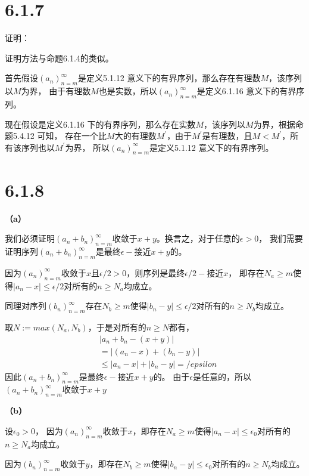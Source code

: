 \documentclass{article}
\theoremstyle{mystyle}
\begin{document}
\section*{6.1.7}

证明：

证明方法与命题6.1.4的类似。

首先假设$(a_n)_{n=m}^\infty$是定义5.1.12 意义下的有界序列，那么存在有理数$M$，该序列以$M$为界，
由于有理数$M$也是实数，所以$(a_n)_{n=m}^\infty$是定义6.1.16 意义下的有界序列。

现在假设是定义6.1.16 下的有界序列，那么存在实数$M$，该序列以$M$为界，根据命题5.4.12 可知，
存在一个比$M$大的有理数$M^\prime$，由于$M^\prime$是有理数，且$M < M^\prime$，所有该序列也以$M^\prime$为界，
所以$(a_n)_{n=m}^\infty$是定义5.1.12 意义下的有界序列。

\section*{6.1.8}

\textbf{（a）}

我们必须证明$(a_n+b_n)_{n=m}^\infty$收敛于$x+y$。换言之，对于任意的$\epsilon > 0$，
我们需要证明序列$(a_n+b_n)_{n=m}^\infty$是最终$\epsilon -$接近$x+y$的。

因为$(a_n)_{n=m}^\infty$收敛于$x$且$\epsilon /2 > 0$，则序列是最终$\epsilon /2 -$接近$x$，
即存在$N_a \geq m$使得$|a_n - x| \leq \epsilon /2$对所有的$n \geq N_a$均成立。

同理对序列$(b_n)_{n=m}^\infty$存在$N_b \geq m$使得$|b_n - y| \leq \epsilon /2$对所有的$n \geq N_b$均成立。

取$N := max(N_a, N_b)$，于是对所有的$n \geq N$都有，
\begin{align*}
   & |a_n + b_n - (x+y)|                   \\
   & =|(a_n - x) + (b_n - y)|              \\
   & \leq |a_n - x| + |b_n - y| = /epsilon
\end{align*}
因此$(a_n+b_n)_{n=m}^\infty$是最终$\epsilon -$接近$x+y$的。
由于$\epsilon$是任意的，所以$(a_n+b_n)_{n=m}^\infty$收敛于$x+y$

\textbf{（b）}

设$\epsilon_0> 0$，
因为$(a_n)_{n=m}^\infty$收敛于$x$，即存在$N_a \geq m$使得$|a_n - x| \leq \epsilon _0$对所有的$n \geq N_a$均成立。

因为$(b_n)_{n=m}^\infty$收敛于$y$，即存在$N_b \geq m$使得$|b_n - y| \leq \epsilon _0$对所有的$n \geq N_b$均成立。
\end{document}

